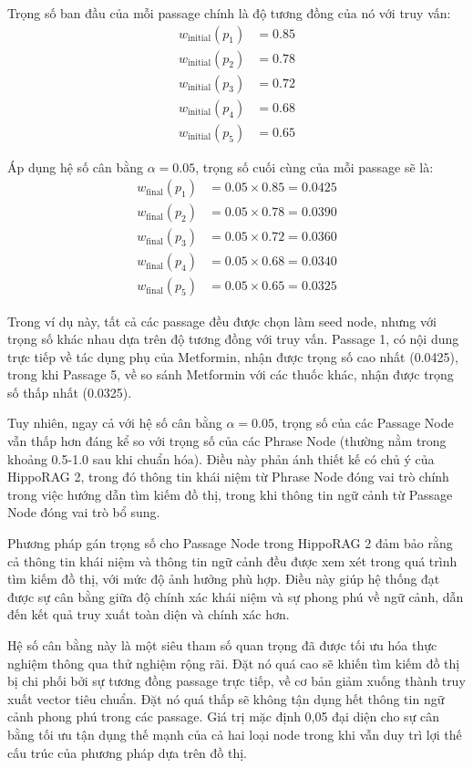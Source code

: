 \documentclass[../main.tex]{subfiles}
\begin{document}
Trọng số ban đầu của mỗi passage chính là độ tương đồng của nó với truy vấn:
\begin{align}
w_{\text{initial}}(p_1) &= 0.85 \\
w_{\text{initial}}(p_2) &= 0.78 \\
w_{\text{initial}}(p_3) &= 0.72 \\
w_{\text{initial}}(p_4) &= 0.68 \\
w_{\text{initial}}(p_5) &= 0.65
\end{align}

Áp dụng hệ số cân bằng \(\alpha = 0.05\), trọng số cuối cùng của mỗi passage sẽ là:
\begin{align}
w_{\text{final}}(p_1) &= 0.05 \times 0.85 = 0.0425 \\
w_{\text{final}}(p_2) &= 0.05 \times 0.78 = 0.0390 \\
w_{\text{final}}(p_3) &= 0.05 \times 0.72 = 0.0360 \\
w_{\text{final}}(p_4) &= 0.05 \times 0.68 = 0.0340 \\
w_{\text{final}}(p_5) &= 0.05 \times 0.65 = 0.0325
\end{align}

Trong ví dụ này, tất cả các passage đều được chọn làm seed node, nhưng với trọng số khác nhau dựa trên độ tương đồng với truy vấn. Passage 1, có nội dung trực tiếp về tác dụng phụ của Metformin, nhận được trọng số cao nhất (0.0425), trong khi Passage 5, về so sánh Metformin với các thuốc khác, nhận được trọng số thấp nhất (0.0325).

Tuy nhiên, ngay cả với hệ số cân bằng \(\alpha = 0.05\), trọng số của các Passage Node vẫn thấp hơn đáng kể so với trọng số của các Phrase Node (thường nằm trong khoảng 0.5-1.0 sau khi chuẩn hóa). Điều này phản ánh thiết kế có chủ ý của HippoRAG 2, trong đó thông tin khái niệm từ Phrase Node đóng vai trò chính trong việc hướng dẫn tìm kiếm đồ thị, trong khi thông tin ngữ cảnh từ Passage Node đóng vai trò bổ sung.

Phương pháp gán trọng số cho Passage Node trong HippoRAG 2 đảm bảo rằng cả thông tin khái niệm và thông tin ngữ cảnh đều được xem xét trong quá trình tìm kiếm đồ thị, với mức độ ảnh hưởng phù hợp. Điều này giúp hệ thống đạt được sự cân bằng giữa độ chính xác khái niệm và sự phong phú về ngữ cảnh, dẫn đến kết quả truy xuất toàn diện và chính xác hơn.

Hệ số cân bằng này là một siêu tham số quan trọng đã được tối ưu hóa thực nghiệm thông qua thử nghiệm rộng rãi. Đặt nó quá cao sẽ khiến tìm kiếm đồ thị bị chi phối bởi sự tương đồng passage trực tiếp, về cơ bản giảm xuống thành truy xuất vector tiêu chuẩn. Đặt nó quá thấp sẽ không tận dụng hết thông tin ngữ cảnh phong phú trong các passage. Giá trị mặc định 0,05 đại diện cho sự cân bằng tối ưu tận dụng thế mạnh của cả hai loại node trong khi vẫn duy trì lợi thế cấu trúc của phương pháp dựa trên đồ thị.
\end{document}
